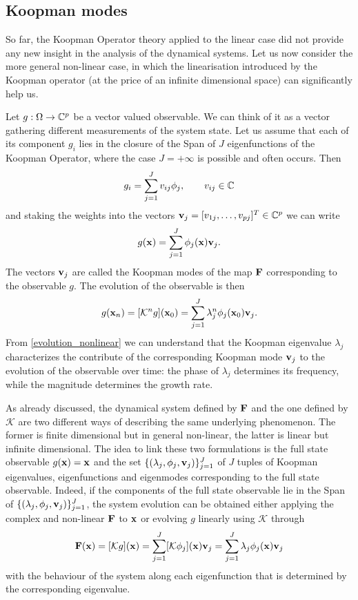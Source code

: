 \subsection{Koopman modes}
So far, the Koopman Operator theory applied to the linear case did not provide any new insight in the analysis of the dynamical systems. Let us now consider the more general non-linear case, in which the linearisation introduced by the Koopman operator (at the price of an infinite dimensional space) can significantly help us.

Let $g:\Omega\to\mathbb{C}^p$ be a vector valued observable. We can think of it as a vector gathering different measurements of the system state. Let us assume that each of its component $g_i$ lies in the closure of the Span of $J$ eigenfunctions of the Koopman Operator, where the case $J=+\infty$ is possible and often occurs. Then 
\begin{equation*}
	g_i = \sum_{j = 1}^J v_{ij}\phi_j, \qquad v_{ij}\in\mathbb{C}
\end{equation*}
and staking the weights into the vectors $\vb{v}_j = [v_{1j},\dots,v_{pj}]^T\in\mathbb{C}^p$ we can write
\begin{equation}
	g(\vb{x}) = \sum_{j = 1}^J \phi_j(\vb{x})\vb{v}_{j}.
\end{equation}
The vectors $\vb{v}_j$ are called the Koopman modes of the map $\vb{F}$ corresponding to the observable $g$. The evolution of the observable is then
\begin{equation}
	\label{evolution_nonlinear}
	g(\vb{x}_n) = [\mathcal{K}^ng](\vb{x}_0) = \sum_{j = 1}^J \lambda_j^n\phi_j(\vb{x}_0)\vb{v}_{j}.
\end{equation}
From \eqref{evolution_nonlinear} we can understand that the Koopman eigenvalue $\lambda_j$ characterizes the contribute of the corresponding Koopman mode $\vb{v}_j$ to the evolution of the observable over time: the phase of $\lambda_j$ determines its frequency, while the magnitude determines the growth rate.

As already discussed, the dynamical system defined by $\vb{F}$ and the one defined by $\mathcal{K}$ are two different ways of describing the same underlying phenomenon. The former is finite dimensional but in general non-linear, the latter is linear but infinite dimensional. The idea to link these two formulations is the full state observable $g(\vb{x}) = \vb{x}$ and the set $\{(\lambda_j, \phi_j, \vb{v}_j)\}_{j = 1}^J$ of $J$ tuples of Koopman eigenvalues, eigenfunctions and eigenmodes corresponding to the full state observable. Indeed, if the components of the full state observable lie in the Span of $\{(\lambda_j, \phi_j, \vb{v}_j)\}_{j = 1}^J$, the system evolution can be obtained either applying the complex and non-linear $\vb{F}$ to $\vb{x}$ or evolving $g$ linearly using $\mathcal{K}$ through
\begin{equation*}
	\vb{F}(\vb{x}) = [\mathcal{K}g](\vb{x}) = \sum_{j = 1}^J [\mathcal{K}\phi_j](\vb{x})\vb{v}_j = \sum_{j = 1}^J \lambda_j\phi_j(\vb{x})\vb{v}_j
\end{equation*}
with the behaviour of the system along each eigenfunction that is determined by the corresponding eigenvalue.
